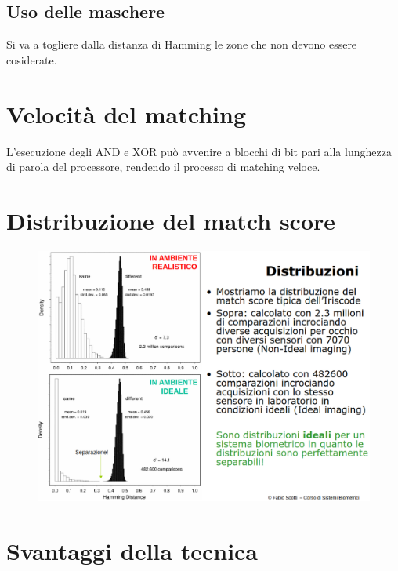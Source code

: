 \documentclass{report}
\begin{document}
\subsection{Uso delle maschere}

Si va a togliere dalla distanza di Hamming le zone che non 
devono essere cosiderate.

\section{Velocità del matching}
L'esecuzione degli AND e XOR può avvenire a blocchi di bit pari 
alla lunghezza di parola del processore, rendendo il processo 
di matching veloce.

\newpage
\section{Distribuzione del match score}

\begin{figure}[ht]
    \centering
    \includegraphics[width=1\linewidth]{images/distr-match-score.png}
\end{figure}

\section{Svantaggi della tecnica}
\end{document}
